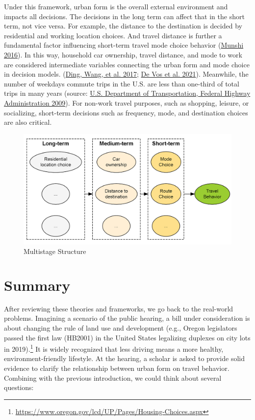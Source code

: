 \documentclass[
  12pt,
]{article}
\begin{document}
Under this framework, urban form is the overall external environment and impacts all decisions. The decisions in the long term can affect that in the short term, not vice versa. For example, the distance to the destination is decided by residential and working location choices. And travel distance is further a fundamental factor influencing short-term travel mode choice behavior (\protect\hyperlink{ref-munshiBuiltEnvironmentMode2016}{Munshi 2016}). In this way, household car ownership, travel distance, and mode to work are considered intermediate variables connecting the urban form and mode choice in decision models. (\protect\hyperlink{ref-dingExploringInfluenceBuilt2017}{Ding, Wang, et al. 2017}; \protect\hyperlink{ref-devosIndirectEffectBuilt2021}{De Vos et al. 2021}). Meanwhile, the number of weekdays commute trips in the U.S. are less than one-third of total trips in many years (source: \protect\hyperlink{ref-nhts_2009}{U.S. Department of Transportation, Federal Highway Administration 2009}). For non-work travel purposes, such as shopping, leisure, or socializing, short-term decisions such as frequency, mode, and destination choices are also critical.

\begin{figure}

{\centering \includegraphics[width=0.5\linewidth]{fig/mstage} 

}

\caption{Multistage Structure}\label{fig:Mstage}
\end{figure}

\hypertarget{summary}{%
\section{Summary}\label{summary}}

After reviewing these theories and frameworks, we go back to the real-world problems. Imagining a scenario of the public hearing, a bill under consideration is about changing the rule of land use and development (e.g., Oregon legislators passed the first law (HB2001) in the United States legalizing duplexes on city lots in 2019).\footnote{\url{https://www.oregon.gov/lcd/UP/Pages/Housing-Choices.aspx}} It is widely recognized that less driving means a more healthy, environment-friendly lifestyle. At the hearing, a scholar is asked to provide solid evidence to clarify the relationship between urban form on travel behavior. Combining with the previous introduction, we could think about several questions:
\end{document}
